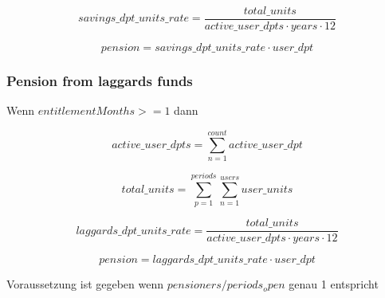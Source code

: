 \begin{equation*}
	savings\_dpt\_units\_rate = 	
	\frac{total\_units} 
	{active\_user\_dpts \cdot years \cdot 12}		
\end{equation*}

\begin{equation*}
	pension = savings\_dpt\_units\_rate \cdot user\_dpt
\end{equation*}


\subsubsection*{Pension from laggards funds}

Wenn $entitlementMonths >= 1$ dann 

\begin{equation*}
	active\_user\_dpts = 
	\sum_{n=1}^{count} active\_user\_dpt
\end{equation*}

\begin{equation*}
	total\_units = 	
	\sum_{p=1}^{periods} \sum_{n=1}^{users} user\_units	
\end{equation*}

\begin{equation*}
	laggards\_dpt\_units\_rate = 	
	\frac{total\_units} 
	{active\_user\_dpts \cdot years \cdot 12}		
\end{equation*}

\begin{equation*}
	pension = laggards\_dpt\_units\_rate \cdot user\_dpt
\end{equation*}


Voraussetzung ist gegeben wenn $pensioners / periods_open$ genau 1 entspricht